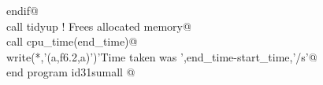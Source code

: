 \documentclass[10pt,a4paper,notitlepage]{article}
\begin{document}
\begin{flushleft}
\begin{minipage}{\linewidth}
\begin{list}{}{}
\mbox{}\verb@      endif@\\
\mbox{}\verb@      call tidyup                                ! Frees allocated memory@\\
\mbox{}\verb@      call cpu_time(end_time)@\\
\mbox{}\verb@      write(*,'(a,f6.2,a)')'Time taken was ',end_time-start_time,'/s'@\\
\mbox{}\verb@      end program id31sumall                                                 @{\NWsep}
\end{list}
\vspace{-1.5ex}
\footnotesize
\begin{list}{}{\setlength{\itemsep}{-\parsep}\setlength{\itemindent}{-\leftmargin}}

\item{}
\end{list}
\end{minipage}\vspace{4ex}
\end{flushleft}
\end{document}
